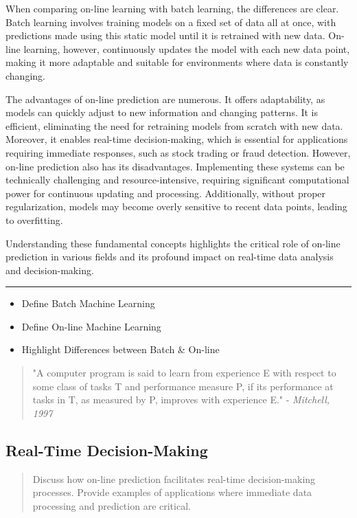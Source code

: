 \documentclass[11pt]{article} %
\theoremstyle{plain}
\theoremstyle{definition}
\begin{document}
When comparing on-line learning with batch learning, the differences are clear. Batch learning involves training models on a fixed set of data all at once, with predictions made using this static model until it is retrained with new data. On-line learning, however, continuously updates the model with each new data point, making it more adaptable and suitable for environments where data is constantly changing.

The advantages of on-line prediction are numerous. It offers adaptability, as models can quickly adjust to new information and changing patterns. It is efficient, eliminating the need for retraining models from scratch with new data. Moreover, it enables real-time decision-making, which is essential for applications requiring immediate responses, such as stock trading or fraud detection. However, on-line prediction also has its disadvantages. Implementing these systems can be technically challenging and resource-intensive, requiring significant computational power for continuous updating and processing. Additionally, without proper regularization, models may become overly sensitive to recent data points, leading to overfitting.

Understanding these fundamental concepts highlights the critical role of on-line prediction in various fields and its profound impact on real-time data analysis and decision-making.

\noindent\rule{\textwidth}{0.1pt}

\begin{itemize}
  \item Define Batch Machine Learning
  \item Define On-line Machine Learning
  \item Highlight Differences between Batch \& On-line
\end{itemize}

\begin{quote}
  "A computer program is said to learn from experience E with respect to some class
  of tasks T and performance measure P, if its performance at tasks in T, as 
  measured by P, improves with experience E." - \textit{Mitchell, 1997}
\end{quote}

\subsection{Real-Time Decision-Making}
\begin{quote}
  Discuss how on-line prediction facilitates real-time decision-making processes. Provide examples of applications where immediate data processing and prediction are critical.
\end{quote}
\end{document}

